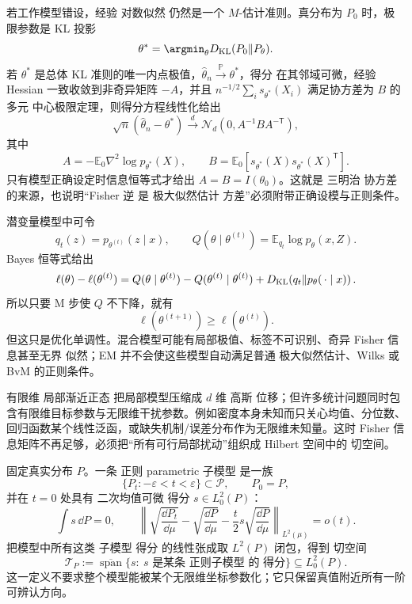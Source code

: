 \begin{theorem}
若工作模型错设，经验 对数似然 仍然是一个 $M$-估计准则。真分布为 $P_0$ 时，极限参数是 KL 投影
\[
 \theta^*=\argmin_\theta
 D_{\rm KL}(P_0\Vert P_\theta).
\]
若 $\theta^*$ 是总体 KL 准则的唯一内点极值，$\widehat\theta_n\xrightarrow{\mathbb P}\theta^*$，得分 在其邻域可微，经验 Hessian 一致收敛到非奇异矩阵 $-A$，并且 $n^{-1/2}\sum_i s_{\theta^*}(X_i)$ 满足协方差为 $B$ 的多元 中心极限定理，则得分方程线性化给出
\[
 \sqrt n(\widehat\theta_n-\theta^*)
 \xrightarrow{d}\mathcal N_d(0,A^{-1}BA^{-\mathsf T}),
\]
其中
\[
 A=-\mathbb E_0\nabla^2\log p_{\theta^*}(X),
 \qquad
 B=\mathbb E_0[s_{\theta^*}(X)s_{\theta^*}(X)^{\mathsf T}].
\]
只有模型正确设定时信息恒等式才给出 $A=B=I(\theta_0)$。这就是 三明治 协方差的来源，也说明“Fisher 逆 是 极大似然估计 方差”必须附带正确设模与正则条件。
\end{theorem}

\begin{note}
潜变量模型中可令
\[
 q_t(z)=p_{\theta^{(t)}}(z\mid x),
 \qquad
 Q(\theta\mid\theta^{(t)})
 =\mathbb E_{q_t}\log p_\theta(x,Z).
\]
Bayes 恒等式给出
\begin{equation*}\ell(\theta)-\ell(\theta^{(t)})
 =Q(\theta\mid\theta^{(t)})-Q(\theta^{(t)}\mid\theta^{(t)})
 +D_{\rm KL}\!\left(q_t\Vert p_\theta(\,\cdot\mid x)\right).
\end{equation*}
所以只要 M 步使 $Q$ 不下降，就有
\begin{equation*}\ell(\theta^{(t+1)})\ge\ell(\theta^{(t)}).
\end{equation*}
但这只是优化单调性。混合模型可能有局部极值、标签不可识别、奇异 Fisher 信息甚至无界 似然；EM 并不会使这些模型自动满足普通 极大似然估计、Wilks 或 BvM 的正则条件。
\end{note}

有限维 局部渐近正态 把局部模型压缩成 $d$ 维 高斯 位移；但许多统计问题同时包含有限维目标参数与无限维干扰参数。例如密度本身未知而只关心均值、分位数、回归函数某个线性泛函，或缺失机制/误差分布作为无限维未知量。这时 Fisher 信息矩阵不再足够，必须把``所有可行局部扰动''组织成 Hilbert 空间中的 切空间。

\begin{definition}[正则子模型与闭切空间]
固定真实分布 $P$。一条 正则 parametric 子模型 是一族
\[
\{P_t:-\varepsilon<t<\varepsilon\}
\subset\mathcal P,
\qquad P_0=P,
\]
并在 $t=0$ 处具有 二次均值可微 得分 $s\in L_0^2(P)$：
\[
\int s\,\dd P=0,
\qquad
\left\|
\sqrt{\frac{\dd P_t}{\dd\mu}}
-
\sqrt{\frac{\dd P}{\dd\mu}}
-
\frac t2 s\sqrt{\frac{\dd P}{\dd\mu}}
\right\|_{L^2(\mu)}
=o(t).
\]
把模型中所有这类 子模型 得分 的线性张成取 $L^2(P)$ 闭包，得到 切空间
\begin{equation*}{
\mathcal T_P
:=\overline{\operatorname{span}}
\{s:\ s\text{ 是某条 正则子模型 的 得分}\}
\subseteq L_0^2(P).
}\end{equation*}
这一定义不要求整个模型能被某个无限维坐标参数化；它只保留真值附近所有一阶可辨认方向。
\end{definition}

